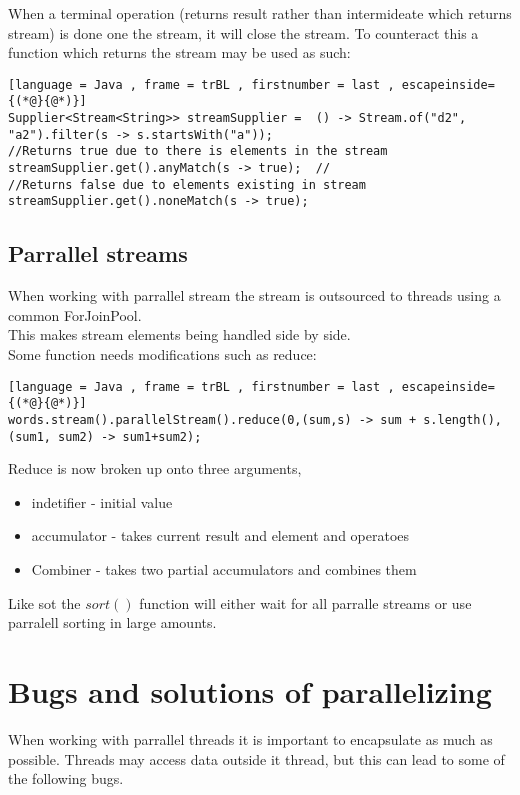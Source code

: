 \documentclass[12pt, a4paper]{article}
\begin{document}
		When a terminal operation (returns result rather than intermideate which returns stream) is done one the stream, it will close the stream. To counteract this a function which returns the stream may be used as such:
	\begin{lstlisting}[language = Java , frame = trBL , firstnumber = last , escapeinside={(*@}{@*)}]
Supplier<Stream<String>> streamSupplier =  () -> Stream.of("d2", "a2").filter(s -> s.startsWith("a"));
//Returns true due to there is elements in the stream
streamSupplier.get().anyMatch(s -> true);  //
//Returns false due to elements existing in stream
streamSupplier.get().noneMatch(s -> true); 
\end{lstlisting}	
	\subsection{Parrallel streams}
		When working with parrallel stream the stream is outsourced to threads using a common ForJoinPool.\\
		This makes stream elements being handled side by side.\\
		Some function needs modifications such as reduce:
\begin{lstlisting}[language = Java , frame = trBL , firstnumber = last , escapeinside={(*@}{@*)}]
words.stream().parallelStream().reduce(0,(sum,s) -> sum + s.length(), (sum1, sum2) -> sum1+sum2);
\end{lstlisting}		
	Reduce is now broken up onto three arguments,
	\begin{itemize}
		\item indetifier - initial value
		\item accumulator - takes current result and element and operatoes
		\item Combiner - takes two partial accumulators and combines them
	\end{itemize}
	Like sot the $sort()$ function will either wait for all parralle streams or use parralell sorting in large amounts.
\section{Bugs and solutions of parallelizing}
	When working with parrallel threads it is important to encapsulate as much as possible. Threads may access data outside it thread, but this can lead to some of the following bugs.
\end{document}
